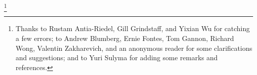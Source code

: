 
\author{Arun Debray}
\date{\today}
\thanks{Thanks to Rustam Antia-Riedel, Gill Grindstaff, and Yixian Wu for catching a few errors; to Andrew
Blumberg, Ernie Fontes, Tom Gannon, Richard Wong, Valentin Zakharevich, and an anonymous reader for some
clarifications and suggestions; and to Yuri Sulyma for adding some remarks and references.}

\usepackage[charter]{mathdesign}
\usepackage[T1]{fontenc}
\usepackage{tikz}
\usetikzlibrary{shapes.geometric}

\renewcommand{\term}[1]{{\bfseries #1}}
\newcommand{\sSet}{\cat{sSet}}
\DeclareMathOperator{\Map}{Map}
\DeclareMathOperator{\rank}{rank\,}
\DeclareMathOperator{\Un}{Un}
\newcommand{\KU}{\mathit{KU}}
\newcommand{\isom}{\stackrel\cong\to}
\DeclareMathOperator{\Ind}{Ind}
\DeclareMathOperator{\CoInd}{CoInd}
\newcommand{\Spc}{\cat{Sp}}
\newcommand{\overwedge}{\mathbin{\overline\wedge}}
\DeclareMathOperator{\Ev}{Ev}
\newcommand{\sW}{\mathscr W}
\DeclareMathOperator{\Ho}{Ho}
\newcommand{\simeqto}{\stackrel\simeq\to}
\newcommand{\congto}{\stackrel\cong\to}
\newcommand{\wI}{\widetilde I}
\newcommand{\WH}{\mathit{WH}}
\newcommand{\NH}{\mathit{NH}}
\newcommand{\sus}{\Sigma^\infty}
\DeclareMathOperator{\Span}{Span}
\DeclareMathOperator{\tr}{tr}
\newcommand{\RO}{\mathrm{RO}}
\DeclareMathOperator{\Res}{Res}
\DeclareMathOperator{\Tr}{Tr}
\newcommand{\fV}{\cat V}
\newcommand{\rop}{^{\mathrm{op}}} %
\newcommand{\cotensor}{\mathbin\square}
\newcommand{\Mac}{\cat{Mac}}
\newcommand{\Bispan}{\cat{Bispan}}
\newcommand{\Orb}{\cat{Orb}}
\newcommand{\THH}{\mathit{THH}}
\newcommand{\MU}{\mathit{MU}}
\renewcommand{\MR}{\mathit{MR}}

\newcommand{\LD}{\mathbf L}
\newcommand{\RD}{\mathbf R}

\DeclareMathOperator{\Lan}{Lan}
\DeclareMathOperator{\Ran}{Ran}

\newcommand{\matr}[4]{
  \begin{bmatrix} #1 & #2 \\ #3 & #4 \end{bmatrix}
}

\newcommand{\morph}{\mathop{\longrightarrow}\limits}
\newcommand{\twomorph}{\mathop{\Longrightarrow}\limits}

